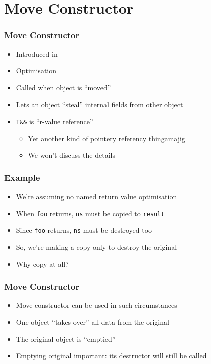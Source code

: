 \section{Move Constructor}

\frame{\tableofcontents[currentsection]}

\begin{frame}
  \frametitle{Move Constructor}
  \begin{itemize}
    \item Introduced in 
    \item Optimisation
    \item Called when object is ``moved''
    \item Lets an object ``steal'' internal fields from other object
    \item \texttt{T\&\&} is ``r-value reference''
          \begin{itemize}
            \item Yet another kind of pointery referency thingamajig
            \item We won't discuss the details
          \end{itemize}
  \end{itemize}
  \vskip4mm
\end{frame}

\begin{frame}
  \frametitle{Example}
  \begin{itemize}
    \item We're assuming no named return value optimisation
    \item When {\tt foo} returns, {\tt ns} must be copied to {\tt result}
    \item Since {\tt foo} returns, {\tt ns} must be destroyed too
    \item So, we're making a copy only to destroy the original
    \item Why copy at all?
  \end{itemize}
\end{frame}

\begin{frame}
  \frametitle{Move Constructor}
  \begin{itemize}
    \item Move constructor can be used in such circumstances
    \item One object ``takes over'' all data from the original
    \item The original object is ``emptied''
    \item Emptying original important: its destructor will still be called
  \end{itemize}
\end{frame}

